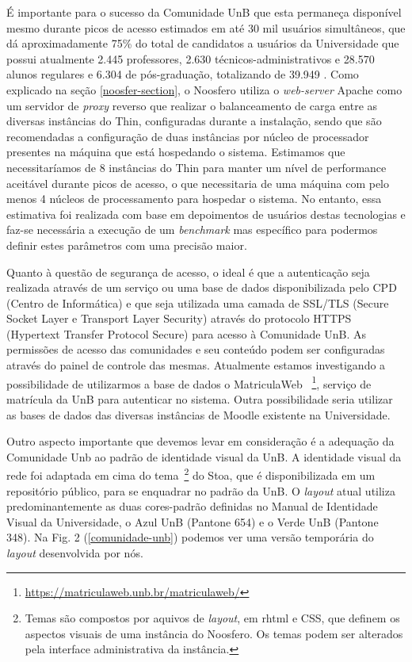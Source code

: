 É importante para o sucesso da Comunidade UnB que esta permaneça disponível
mesmo durante picos de acesso estimados em até 30 mil usuários simultâneos,
que dá aproximadamente 75\% do total de candidatos a usuários da Universidade
que possui atualmente 2.445 professores, 2.630 técnicos-administrativos
e 28.570 alunos regulares e 6.304 de pós-graduação, totalizando de 39.949
\cite{unbInstituicao}. Como explicado na seção \ref{noosfer-section}, o Noosfero
utiliza o \textit{web-server} Apache como um servidor de \textit{proxy} reverso
que realizar o balanceamento de carga entre as diversas instâncias do Thin,
configuradas durante a instalação, sendo que são recomendadas a configuração de
duas instâncias por núcleo de processador presentes na máquina que está
hospedando o sistema.
%
Estimamos que necessitaríamos de 8 instâncias do Thin
para manter um nível de performance aceitável durante picos de acesso, o que
necessitaria de uma máquina com pelo menos 4 núcleos de processamento para
hospedar o sistema. No entanto, essa estimativa foi realizada com base em
depoimentos de usuários destas tecnologias e faz-se necessária a execução de
um \textit{benchmark} mas específico para podermos definir estes parâmetros com
uma precisão maior.

Quanto à questão de segurança de acesso, o ideal é que a autenticação seja
realizada através de um serviço ou uma base de dados disponibilizada pelo CPD
(Centro de Informática) e que seja utilizada uma camada de SSL/TLS (Secure Socket
Layer e Transport Layer Security) através do protocolo HTTPS (Hypertext Transfer
Protocol Secure) para acesso à Comunidade UnB. As permissões de acesso das
comunidades e seu conteúdo podem ser configuradas através do painel de controle
das mesmas. Atualmente estamos investigando a possibilidade de utilizarmos a
base de dados o MatriculaWeb
~\footnote{\url{https://matriculaweb.unb.br/matriculaweb/}}, serviço de matrícula
da UnB para autenticar no sistema. Outra possibilidade seria utilizar as bases
de dados das diversas instâncias de Moodle existente na Universidade.
	


Outro aspecto importante que devemos levar em consideração é a adequação da
Comunidade Unb ao padrão de identidade visual da UnB.
A identidade visual da rede foi adaptada em cima do tema~\footnote{Temas são
compostos por aquivos de \textit{layout}, em rhtml e CSS, que definem os aspectos
visuais de uma instância do Noosfero. Os temas podem ser alterados pela interface
administrativa da instância.} do Stoa, que é disponibilizada em um repositório
público, para se enquadrar no padrão da UnB.
%
O \textit{layout} atual utiliza predominantemente as duas cores-padrão definidas
no Manual de Identidade Visual da Universidade\cite{visualUnB}, o Azul UnB
(Pantone 654) e o Verde UnB (Pantone 348). Na Fig. 2 (\ref{comunidade-unb})
podemos ver uma versão temporária do \textit{layout} desenvolvida por nós.

